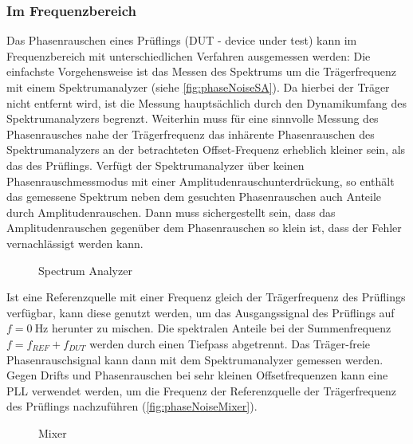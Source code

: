 \subsubsection{Im Frequenzbereich}
Das Phasenrauschen eines Prüflings (DUT - device under test) kann im Frequenzbereich mit unterschiedlichen Verfahren ausgemessen werden: Die einfachste Vorgehensweise ist das Messen des Spektrums um die Trägerfrequenz mit einem Spektrumanalyzer (siehe \autoref{fig:phaseNoiseSA}).
Da hierbei der Träger nicht entfernt wird, ist die Messung hauptsächlich durch den Dynamikumfang des Spektrumanalyzers begrenzt. Weiterhin muss für eine sinnvolle Messung des Phasenrausches nahe der Trägerfrequenz das inhärente Phasenrauschen des Spektrumanalyzers an der betrachteten Offset-Frequenz erheblich kleiner sein, als das des Prüflings. Verfügt der Spektrumanalyzer über keinen Phasenrauschmessmodus mit einer Amplitudenrauschunterdrückung, so enthält das gemessene Spektrum neben dem gesuchten Phasenrauschen auch Anteile durch Amplitudenrauschen. Dann muss sichergestellt sein, dass das Amplitudenrauschen gegenüber dem Phasenrauschen so klein ist, dass der Fehler vernachlässigt werden kann. 

\begin{figure}[H]
	\centering
	\caption[ph]{Spectrum Analyzer}
	\label{fig:phaseNoiseSA}
\end{figure}

Ist eine Referenzquelle mit einer Frequenz gleich der Trägerfrequenz des Prüflings verfügbar, kann diese genutzt werden, um das Ausgangssignal des Prüflings auf $f=\SI{0}{\hertz}$ herunter zu mischen. Die spektralen Anteile bei der Summenfrequenz $f=f_{REF}+f_{DUT}$ werden durch einen Tiefpass abgetrennt. Das Träger-freie Phasenrauschsignal kann dann mit dem Spektrumanalyzer gemessen werden.
Gegen Drifts und Phasenrauschen bei sehr kleinen Offsetfrequenzen kann eine PLL verwendet werden, um die Frequenz der Referenzquelle der Trägerfrequenz des Prüflings nachzuführen (\autoref{fig:phaseNoiseMixer}).

\begin{figure}[H]
	\centering
	\caption[ph]{Mixer}
	\label{fig:phaseNoiseMixer}
\end{figure}












